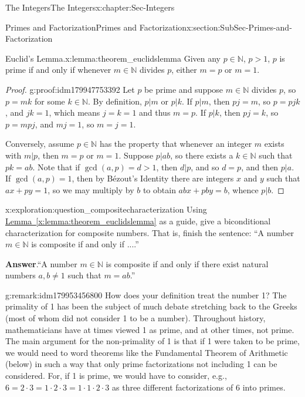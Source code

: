 \documentclass[oneside,10pt,]{book}
\newcommand{\blocktitlefont}{\relax}
\newcommand{\xreffont}{\relax}
\numberwithin{equation}{section}
\def\N{{\mathbb N}}
\begin{document}
\begin{chapterptx}{The Integers}{}{The Integers}{}{}{x:chapter:Sec-Integers}
\begin{sectionptx}{Primes and Factorization}{}{Primes and Factorization}{}{}{x:section:SubSec-Primes-and-Factorization}
\begin{lemma}{Euclid's Lemma.}{}{x:lemma:theorem_euclidslemma}%
Given any \(p\in \N\), \(p > 1\), \(p\) is prime if and only if whenever \(m\in \N\) divides \(p\), either \(m = p\) or \(m = 1\).%
\end{lemma}
\begin{proof}{}{g:proof:idm179947753392}
Let \(p\) be prime and suppose \(m\in \N\) divides \(p\), so \(p = mk\) for some \(k\in \N\). By definition, \(p|m\) or \(p|k\). If \(p|m\), then \(pj = m\), so \(p = pjk\), and \(jk=1\), which means \(j=k=1\) and thus \(m=p\). If \(p|k\), then \(pj=k\), so \(p = mpj\), and \(mj=1\), so \(m = j = 1\).%
\par
Conversely, assume \(p\in \N\) has the property that whenever an integer \(m\) exists with \(m|p\), then \(m= p\) or \(m =1\). Suppose \(p|ab\), so there exists a \(k\in\N\) such that \(pk = ab\). Note that if \(\gcd(a,p) = d > 1\), then \(d|p\), and so \(d = p\), and then \(p|a\). If \(\gcd(a,p) = 1\), then by Bézout's Identity there are integers \(x\) and \(y\) such that \(ax + py = 1\), so we may multiply by \(b\) to obtain \(abx + pby = b\), whence \(p|b\).%
\end{proof}
\begin{exploration}{}{x:exploration:question_compositecharacterization}%
Using \hyperref[x:lemma:theorem_euclidslemma]{Lemma~{\xreffont\ref{x:lemma:theorem_euclidslemma}}} as a guide, give a biconditional characterization for composite numbers. That is, finish the sentence: ``A number \(m\in\N\) is composite if and only if ....''%
\par\smallskip%
\noindent\textbf{\blocktitlefont Answer}.\hypertarget{g:answer:idm179953458720}{}\quad{}``A number \(m\in\N\) is composite if and only if there exist natural numbers \(a,b\ne 1\) such that \(m = ab\).''%
\end{exploration}
\begin{remark}{}{g:remark:idm179953456800}%
How does your definition treat the number 1? The primality of 1 has been the subject of much debate stretching back to the Greeks (most of whom did not consider 1 to be a number). Throughout history, mathematicians have at times viewed 1 as prime, and at other times, not prime. The main argument for the non-primality of 1 is that if 1 were taken to be prime, we would need to word theorems like the Fundamental Theorem of Arithmetic (below) in such a way that only prime factorizations not including 1 can be considered. For, if 1 is prime, we would have to consider, e.g., \(6 = 2\cdot 3 = 1\cdot 2 \cdot 3 = 1\cdot 1\cdot 2\cdot 3\) as three different factorizations of 6 into primes.%

\end{remark}
\end{sectionptx}
\end{chapterptx}
\end{document}
